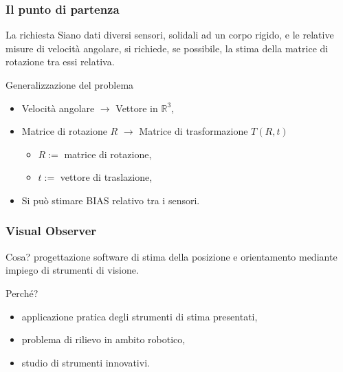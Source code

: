 \documentclass{beamer}
\begin{document}
\begin{frame}
\frametitle{Il punto di partenza}
\begin{block}{La richiesta}
	Siano dati diversi sensori, solidali ad un corpo rigido, e le relative misure di velocità angolare, si richiede, se possibile, la stima della matrice di rotazione tra essi relativa. 
\end{block}

\begin{block}{Generalizzazione del problema}
	\begin{itemize}
		\item Velocità angolare $\longrightarrow$ Vettore in $\mathbb{R}^3$,
		\item Matrice di rotazione $R$ $\longrightarrow$ Matrice di trasformazione $T(R, t)$
		\begin{itemize}
				\item $R :=$ matrice di rotazione,
				\item $t :=$ vettore di traslazione,
		\end{itemize}
		\item Si può stimare BIAS relativo tra i sensori.
	\end{itemize} 
\end{block}
\end{frame}

\begin{frame}
\frametitle{Visual Observer}

\begin{block}{Cosa?}
	progettazione software di stima della posizione e orientamento mediante impiego di strumenti di visione.
\end{block}

\begin{block}{Perché?}
	\begin{itemize}	
		\item applicazione pratica degli strumenti di stima presentati,
		\item problema di rilievo in ambito robotico,
		\item studio di strumenti innovativi.
	\end{itemize} 
\end{block}
\end{frame}
\end{document}
